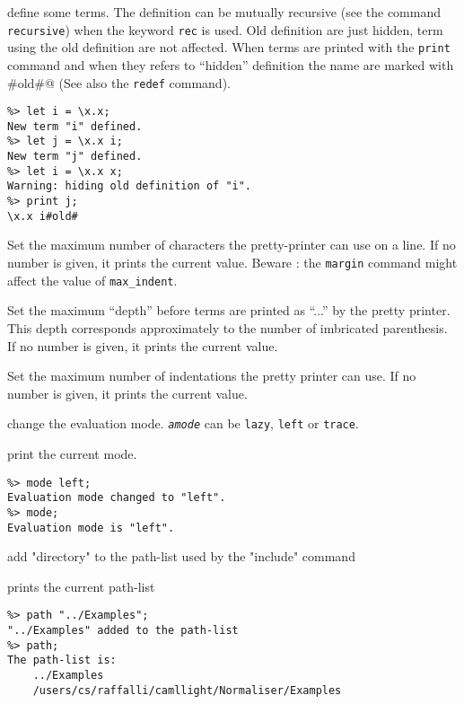 {{\begin{definition}
   define some terms. The definition can be mutually
  recursive (see the command {\tt recursive}) when the keyword {\tt rec} is
  used. Old definition are just hidden, term using the old definition are not
  affected. When terms are printed with the {\tt print} command and when they
  refers to ``hidden'' definition the name are marked with \verb@#old#@ (See
  also the {\tt redef} command).
 
\begin{verbatim}
%> let i = \x.x;
New term "i" defined.
%> let j = \x.x i;
New term "j" defined.
%> let i = \x.x x;
Warning: hiding old definition of "i".
%> print j;
\x.x i#old#
\end{verbatim}
  
   Set the maximum number of characters
  the pretty-printer can use on a line. If no number is given, it prints the
  current value. Beware : the {\tt margin} command might affect the value of 
  {\tt max\_indent}.
  
   Set the maximum ``depth'' before terms
  are printed as ``...'' by the pretty printer. This depth corresponds
  approximately to the number of imbricated parenthesis. If no number is
  given, it prints the current value.
  
   Set the maximum number of indentations
  the pretty printer can use. If no number is given, it prints the current
  value.
        
 change the evaluation mode. {\tt\it amode}
  can be {\tt lazy}, {\tt left} or {\tt trace}.

 print the current mode.
\begin{verbatim}
%> mode left;
Evaluation mode changed to "left".
%> mode;
Evaluation mode is "left".
\end{verbatim}

        add "directory" to the path-list used by the "include" command

        prints the current path-list
\begin{verbatim}
%> path "../Examples";
"../Examples" added to the path-list
%> path;
The path-list is:
    ../Examples
    /users/cs/raffalli/camllight/Normaliser/Examples
\end{verbatim}
        

\end{definition}}}
